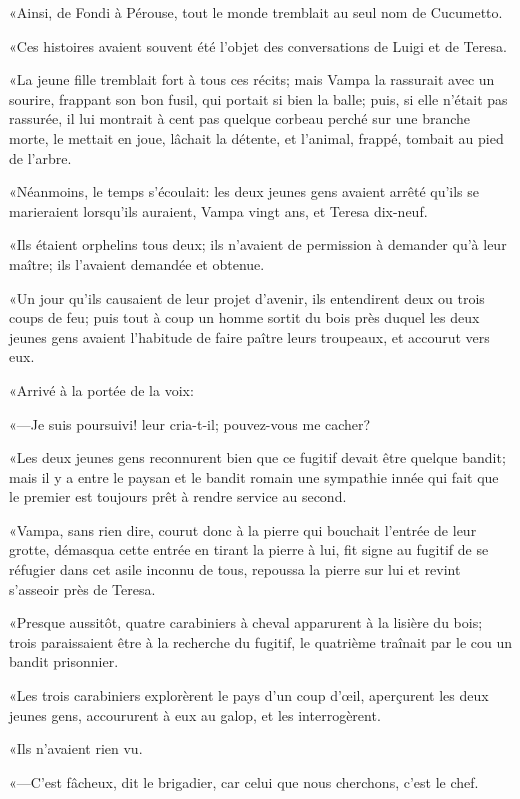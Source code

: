 «Ainsi, de Fondi à Pérouse, tout le monde tremblait au seul nom de Cucumetto. 

«Ces histoires avaient souvent été l'objet des conversations de Luigi et de Teresa. 

«La jeune fille tremblait fort à tous ces récits; mais Vampa la rassurait avec un sourire, frappant son bon fusil, qui portait si bien la balle; puis, si elle n'était pas rassurée, il lui montrait à cent pas quelque corbeau perché sur une branche morte, le mettait en joue, lâchait la détente, et l'animal, frappé, tombait au pied de l'arbre. 

«Néanmoins, le temps s'écoulait: les deux jeunes gens avaient arrêté qu'ils se marieraient lorsqu'ils auraient, Vampa vingt ans, et Teresa dix-neuf. 

«Ils étaient orphelins tous deux; ils n'avaient de permission à demander qu'à leur maître; ils l'avaient demandée et obtenue. 

«Un jour qu'ils causaient de leur projet d'avenir, ils entendirent deux ou trois coups de feu; puis tout à coup un homme sortit du bois près duquel les deux jeunes gens avaient l'habitude de faire paître leurs troupeaux, et accourut vers eux. 

«Arrivé à la portée de la voix: 

«—Je suis poursuivi! leur cria-t-il; pouvez-vous me cacher? 

«Les deux jeunes gens reconnurent bien que ce fugitif devait être quelque bandit; mais il y a entre le paysan et le bandit romain une sympathie innée qui fait que le premier est toujours prêt à rendre service au second. 

«Vampa, sans rien dire, courut donc à la pierre qui bouchait l'entrée de leur grotte, démasqua cette entrée en tirant la pierre à lui, fit signe au fugitif de se réfugier dans cet asile inconnu de tous, repoussa la pierre sur lui et revint s'asseoir près de Teresa. 

«Presque aussitôt, quatre carabiniers à cheval apparurent à la lisière du bois; trois paraissaient être à la recherche du fugitif, le quatrième traînait par le cou un bandit prisonnier. 

«Les trois carabiniers explorèrent le pays d'un coup d'œil, aperçurent les deux jeunes gens, accoururent à eux au galop, et les interrogèrent. 

«Ils n'avaient rien vu. 

«—C'est fâcheux, dit le brigadier, car celui que nous cherchons, c'est le chef. 

